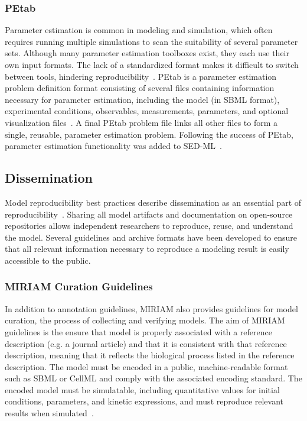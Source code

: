 \documentclass[12pt]{report}
\begin{document}
\subsubsection{PEtab}
Parameter estimation is common in modeling and simulation, which often requires running multiple simulations to scan the suitability of several parameter sets.  Although many parameter estimation toolboxes exist, they each use their own input formats. The lack of a standardized format makes it difficult to switch between tools, hindering reproducibility~\cite{Schmiester2021}.  PEtab is a parameter estimation problem definition format consisting of several files containing information necessary for parameter estimation, including the model (in SBML format), experimental conditions, observables, measurements, parameters, and optional visualization files~\cite{Schmiester2021}. A final PEtab problem file links all other files to form a single, reusable, parameter estimation problem. Following the success of PEtab, parameter estimation functionality was added to SED-ML~\cite{Smith2021simulation}.

\subsection{Dissemination}
Model reproducibility best practices describe dissemination as an essential part of reproducibility~\cite{porubsky_best_2020}. Sharing all model artifacts and documentation on open-source repositories allows independent researchers to reproduce, reuse, and understand the model. Several guidelines and archive formats have been developed to ensure that all relevant information necessary to reproduce a modeling result is easily accessible to the public.


\subsubsection{MIRIAM Curation Guidelines}
In addition to annotation guidelines, MIRIAM also provides guidelines for model curation, the process of collecting and verifying models. The aim of MIRIAM guidelines is the ensure that model is properly associated with a reference description (e.g. a journal article) and that it is consistent with that reference description, meaning that it reflects the biological process listed in the reference description. The model must be encoded in a public, machine-readable format such as SBML or CellML and comply with the associated encoding standard. The encoded model must be simulatable, including quantitative values for initial conditions, parameters, and kinetic expressions, and must reproduce relevant results when simulated~\cite{novere_minimum_2005}.
\end{document}
